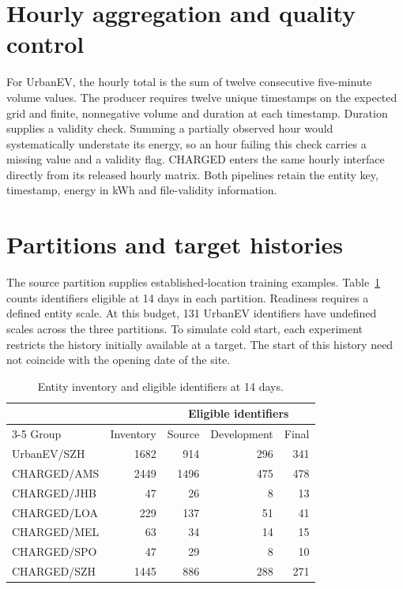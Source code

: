 \section{Hourly aggregation and quality control}
For UrbanEV, the hourly total is the sum of twelve consecutive five-minute volume values. The producer requires twelve unique timestamps on the expected grid and finite, nonnegative volume and duration at each timestamp. Duration supplies a validity check. Summing a partially observed hour would systematically understate its energy, so an hour failing this check carries a missing value and a validity flag. CHARGED enters the same hourly interface directly from its released hourly matrix. Both pipelines retain the entity key, timestamp, energy in kWh and file-validity information.

\section{Partitions and target histories}
The source partition supplies established-location training examples. Table~\ref{tab:scope} counts identifiers eligible at 14 days in each partition. Readiness requires a defined entity scale. At this budget, 131 UrbanEV identifiers have undefined scales across the three partitions. To simulate cold start, each experiment restricts the history initially available at a target. The start of this history need not coincide with the opening date of the site.

\begin{table}[htbp]\centering\small
\caption{Entity inventory and eligible identifiers at 14 days.}\label{tab:scope}
\begin{tabular}{lrrrr}\toprule
 & &\multicolumn{3}{c}{Eligible identifiers}\\
\cmidrule(lr){3-5}
Group & Inventory & Source & Development & Final\\\midrule
UrbanEV/SZH &1682&914&296&341\\
CHARGED/AMS &2449&1496&475&478\\
CHARGED/JHB &47&26&8&13\\
CHARGED/LOA &229&137&51&41\\
CHARGED/MEL &63&34&14&15\\
CHARGED/SPO &47&29&8&10\\
CHARGED/SZH &1445&886&288&271\\\bottomrule
\end{tabular}\end{table}


